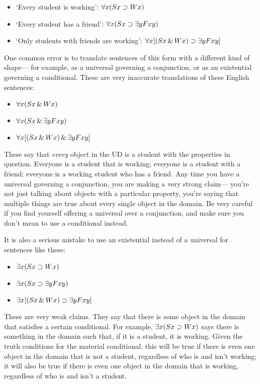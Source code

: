 \begin{itemize}
\item `Every student is working': $\forall x (Sx \supset Wx)$
\item `Every student has a friend': $\forall x (Sx \supset \exists y Fxy)$
\item `Only students with friends are working': $\forall x [(Sx \,\&\, Wx) \supset \exists y Fxy]$
\end{itemize}

One common error is to translate sentences of this form with a different kind of shape--- for example, as a universal governing a conjunction, or as an existential governing a conditional. These are very inaccurate translations of these English sentences:

\begin{itemize}
\item $\forall x (Sx \,\&\, Wx)$
\item $\forall x (Sx \,\&\, \exists y Fxy)$
\item $\forall x [(Sx \,\&\, Wx) \,\&\, \exists y Fxy]$
\end{itemize}

These say that \emph{every} object in the UD is a student with the properties in question. Everyone is a student that is working; everyone is a student with a friend; everyone is a working student who has a friend. Any time you have a universal governing a conjunction, you are making a very strong claim--- you're not just talking about objects with a particular property, you're saying that multiple things are true about every single object in the domain. Be very careful if you find yourself offering a universal over a conjunction, and make sure you don't mean to use a conditional instead.

It is also a serious mistake to use an existential instead of a universal for sentences like these:

\begin{itemize}
\item $\exists x (Sx \supset Wx)$
\item $\exists x (Sx \supset \exists y Fxy)$
\item $\exists x [(Sx \,\&\, Wx) \supset \exists y Fxy]$
\end{itemize}

These are very weak claims. They say that there is some object in the domain that satisfies a certain conditional. For example, $\exists x (Sx \supset Wx)$ says there is something in the domain such that, if it is a student, it is working. Given the truth conditions for the material conditional, this will be true if there is even one object in the domain that is not a student, regardless of who is and isn't working; it will also be true if there is even one object in the domain that is working, regardless of who is and isn't a student.

